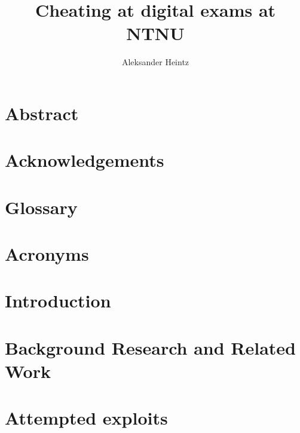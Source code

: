 \documentclass{tudelft-report}
\begin{document}
\frontmatter

\title[Optional Subtitle]{Cheating at digital exams at NTNU}
\author{Aleksander Heintz}
\makecover



\chapter*{Abstract}


\chapter*{Acknowledgements}


%

\renewcommand{\baselinestretch}{0.8}
\tableofcontents
\listoffigures
\renewcommand{\baselinestretch}{1.7}

\chapter{Glossary}


\chapter{Acronyms}


\mainmatter

\chapter{Introduction}\label{cha:1}









\chapter{Background Research and Related Work}\label{cha:2}




\chapter{Attempted exploits}\label{cha:3}





\end{document}
